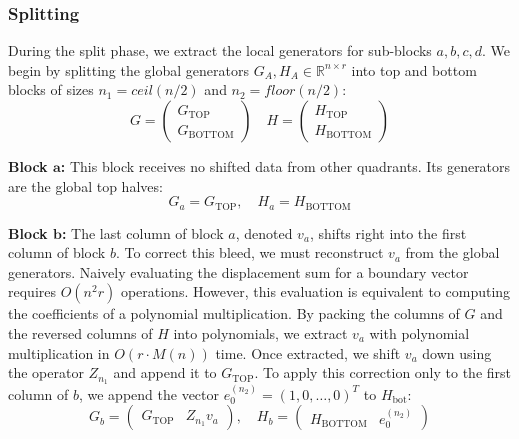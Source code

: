 \vspace{0.2cm}

\subsubsection{Splitting}

During the split phase, we extract the local generators for
sub-blocks $a, b, c, d$.
We begin by splitting the global generators $G_A, H_A \in
\mathbb{R}^{n \times r}$ into top and bottom blocks of sizes $n_1 =
ceil(n/2)$ and $n_2 = floor(n/2)$:
\begin{equation*}
  G =
  \begin{pmatrix} G_{\text{TOP}} \\ G_{\text{BOTTOM}}
  \end{pmatrix}
  \quad
  H =
  \begin{pmatrix} H_{\text{TOP}} \\ H_{\text{BOTTOM}}
  \end{pmatrix}
\end{equation*}

\vspace{0.5em}
\noindent\textbf{Block $\boldsymbol{a}$:}
This block receives no shifted data from other quadrants.
Its generators are the global top halves:
$$ G_{a} = G_{\text{TOP}}, \quad H_{a} = H_{\text{BOTTOM}} $$

\vspace{0.5em}
\noindent\textbf{Block $\boldsymbol{b}$:}
The last column of block $a$, denoted $v_a$, shifts right into the
first column of block $b$.
To correct this bleed, we must reconstruct $v_a$ from the global generators.
Naively evaluating the displacement sum for a boundary vector
requires $O(n^2 r)$ operations.
However, this evaluation is equivalent to computing the coefficients
of a polynomial multiplication.
By packing the columns of $G$ and the reversed columns of $H$ into
polynomials, we extract $v_a$ with polynomial multiplication in $O(r
\cdot M(n))$ time.
Once extracted, we shift $v_a$ down using the operator $Z_{n_1}$ and
append it to $G_{\text{TOP}}$.
To apply this correction only to the first column of $b$, we append
the vector $e_0^{(n_2)} = (1, 0, \dots, 0)^T$ to $H_{\text{bot}}$:
$$ G_{b} =
\begin{pmatrix} G_{\text{TOP}} & Z_{n_1} v_a
\end{pmatrix}, \quad H_{b} =
\begin{pmatrix} H_{\text{BOTTOM}} & e_0^{(n_2)}
\end{pmatrix} $$

